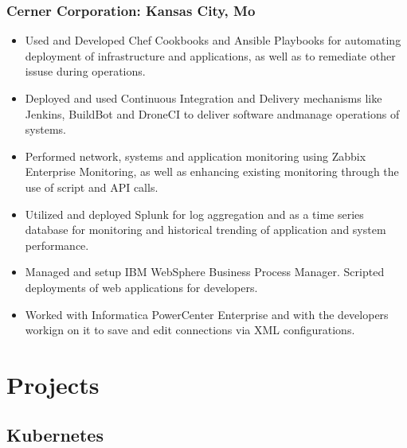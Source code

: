 \documentclass{article}
\begin{document}
      \subsubsection{Cerner Corporation: Kansas City, Mo}

        \begin{scriptsize}
        \begin{itemize}

          \item Used and Developed Chef Cookbooks and Ansible Playbooks for
            automating deployment of infrastructure and applications, as well
            as to remediate other issuse during operations.

          \item Deployed and used Continuous Integration and Delivery
            mechanisms like Jenkins, BuildBot and DroneCI to deliver software
            andmanage operations of systems.

          \item Performed network, systems and application monitoring using
            Zabbix Enterprise Monitoring, as well as enhancing existing
            monitoring through the use of script and API calls.

          \item Utilized and deployed Splunk for log aggregation and as a time
            series database for monitoring and historical trending of
            application and system performance.

          \item Managed and setup IBM WebSphere Business Process Manager.
            Scripted deployments of web applications for developers.

          \item Worked with Informatica PowerCenter Enterprise and with the
            developers workign on it to save and edit connections via XML
            configurations.

        \end{itemize}
        \end{scriptsize}

  \section{Projects}

    \subsection{Kubernetes}
\end{document}
